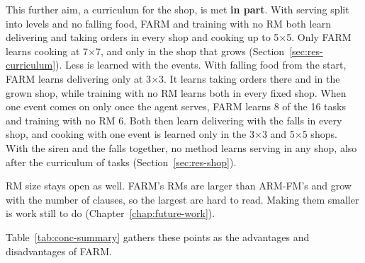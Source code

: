 \documentclass[11pt,english,listoffigures,listoftables]{tfgetsinf}
\begin{document}
This further aim, a curriculum for the shop, is met \textbf{in part}. With serving split into levels and no falling food, FARM and training with no RM both learn delivering and taking orders in every shop and cooking up to 5$\times$5. Only FARM learns cooking at 7$\times$7, and only in the shop that grows (Section~\ref{sec:res-curriculum}). Less is learned with the events. With falling food from the start, FARM learns delivering only at 3$\times$3. It learns taking orders there and in the grown shop, while training with no RM learns both in every fixed shop. When one event comes on only once the agent serves, FARM learns 8 of the 16 tasks and training with no RM 6. Both then learn delivering with the falls in every shop, and cooking with one event is learned only in the 3$\times$3 and 5$\times$5 shops. With the siren and the falls together, no method learns serving in any shop, also after the curriculum of tasks (Section~\ref{sec:res-shop}).

RM size stays open as well. FARM's RMs are larger than ARM-FM's and grow with the number of clauses, so the largest are hard to read. Making them smaller is work still to do (Chapter~\ref{chap:future-work}).

Table~\ref{tab:conc-summary} gathers these points as the advantages and disadvantages of FARM.
\end{document}
